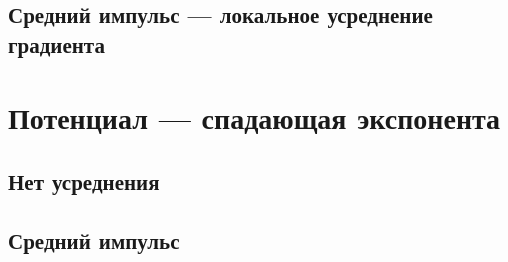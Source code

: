 \documentclass[a4paper,14pt]{extarticle}
\begin{document}
\subsection{Средний импульс --- локальное усреднение градиента}


\section{Потенциал --- спадающая экспонента}


\subsection{Нет усреднения}




\subsection{Средний импульс}






\end{document}
